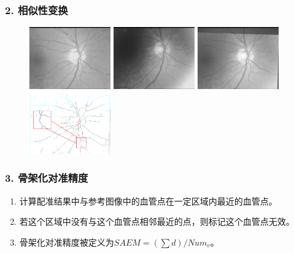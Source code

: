 \documentclass[notheorems,mathserif,table,compress]{beamer}  %
\begin{document}
\begin{frame}
\frametitle{2. 相似性变换}
\begin{figure}
\centering
\begin{minipage}[b]{0.48\textwidth} 
      \centering 
      \includegraphics[width=3.5cm]{chap03/R096}
     \caption*{\color{blue}{参考图像}}
\end{minipage}
  \begin{minipage}[b]{0.48\textwidth}
    \centering
    \includegraphics[width=3.5cm]{chap03/R212}
     \caption*{\color{blue}{待配准图像}}
  \end{minipage}
  \begin{minipage}[b]{0.48\textwidth}
    \centering
    \includegraphics[width=3.5cm]{chap03/096-212-result}
     \caption*{\color{blue}{原始配准结果}}
  \end{minipage}
  \begin{minipage}[b]{0.48\textwidth}
    \centering
    \includegraphics[width=3.5cm]{chap03/096-212-local}
          \caption*{\color{blue}{骨架化配准结果}}
  \end{minipage}
\end{figure}
\end{frame}

\begin{frame}
\frametitle{3. 骨架化对准精度}
\begin{enumerate}
\item 计算配准结果中与参考图像中的血管点在一定区域内最近的血管点。
\vspace{0.5cm}
\item 若这个区域中没有与这个血管点相邻最近的点，则标记这个血管点无效。
\vspace{0.5cm}
\item 骨架化对准精度被定义为$SAEM = (\sum d) / Num_v$。

\end{enumerate}
\end{frame}
\end{document}
